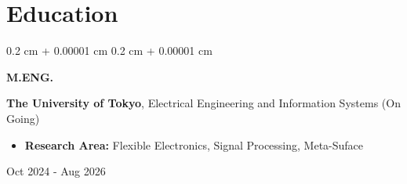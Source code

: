 \documentclass[10pt, letterpaper]{article}
\newenvironment{highlights}{
    \begin{itemize}[
        topsep=0.10 cm,
        parsep=0.10 cm,
        partopsep=0pt,
        itemsep=0pt,
        leftmargin=0.4 cm + 10pt
    ]
}{
    \end{itemize}
} %
\newenvironment{highlightsforbulletentries}{
    \begin{itemize}[
        topsep=0.10 cm,
        parsep=0.10 cm,
        partopsep=0pt,
        itemsep=0pt,
        leftmargin=10pt
    ]
}{
    \end{itemize}
} %
\newenvironment{onecolentry}{
    \begin{adjustwidth}{
        0.2 cm + 0.00001 cm
    }{
        0.2 cm + 0.00001 cm
    }
}{
    \end{adjustwidth}
} %
\newenvironment{threecolentry}[3][]{
    \onecolentry
    \def\thirdColumn{#3}
    \setcolumnwidth{1 cm, \fill, 3.5 cm}
    \begin{paracol}{3}
    {\raggedright #2} \switchcolumn
}{
    \switchcolumn \raggedleft \thirdColumn
    \end{paracol}
    \endonecolentry
} %
\let\hrefWithoutArrow\href
\renewcommand{\href}[2]{\hrefWithoutArrow{#1}{\ifthenelse{\equal{#2}{}}{ }{#2 }\raisebox{.15ex}{\footnotesize \faExternalLink*}}}
\begin{document}



    









    \section{Education}


    \begin{threecolentry}{\textbf{M.ENG.}}{
        Oct 2024 - Aug 2026
    }
        \textbf{The University of Tokyo}, Electrical Engineering and Information Systems (On Going)
        \begin{highlights}
            \item \textbf{Research Area:} Flexible Electronics, Signal Processing, Meta-Suface
    
            
        \end{highlights}
        \vspace{0.15 cm}

    \end{threecolentry}
        
\end{document}
